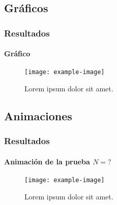 \documentclass[hyperref={pdfpagelayout=SinglePage}]{beamer}
\begin{document}
\subsection{Gráficos}

\begin{frame}
\frametitle{Resultados}
\framesubtitle{Gráfico}
\begin{figure}[H]
        \centering
        \texttt{[image: example-image]}
        \caption{Lorem ipsum dolor sit amet.}
\end{figure}
\end{frame}

\subsection{Animaciones}

\begin{frame}
\frametitle{Resultados}
\framesubtitle{Animación de la prueba $N = ?$}
\begin{figure}[H]
        \centering
        \texttt{[image: example-image]}
        \caption{Lorem ipsum dolor sit amet.}
\end{figure}
\end{frame}
\end{document}
